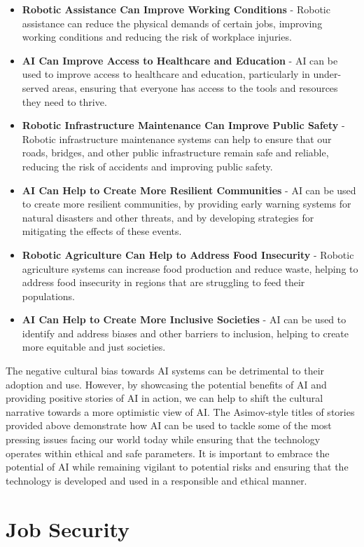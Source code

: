 \documentclass{article}
\begin{document}
\begin{itemize}
\item \textbf{Robotic Assistance Can Improve Working Conditions} - Robotic assistance can reduce the physical demands of certain jobs, improving working conditions and reducing the risk of workplace injuries.
\item \textbf{AI Can Improve Access to Healthcare and Education} - AI can be used to improve access to healthcare and education, particularly in under-served areas, ensuring that everyone has access to the tools and resources they need to thrive.
\item \textbf{Robotic Infrastructure Maintenance Can Improve Public Safety} - Robotic infrastructure maintenance systems can help to ensure that our roads, bridges, and other public infrastructure remain safe and reliable, reducing the risk of accidents and improving public safety.
\item \textbf{AI Can Help to Create More Resilient Communities} - AI can be used to create more resilient communities, by providing early warning systems for natural disasters and other threats, and by developing strategies for mitigating the effects of these events.
\item \textbf{Robotic Agriculture Can Help to Address Food Insecurity} - Robotic agriculture systems can increase food production and reduce waste, helping to address food insecurity in regions that are struggling to feed their populations.
\item \textbf{AI Can Help to Create More Inclusive Societies} - AI can be used to identify and address biases and other barriers to inclusion, helping to create more equitable and just societies.
\end{itemize}

The negative cultural bias towards AI systems can be detrimental to their adoption and use. However, by showcasing the potential benefits of AI and providing positive stories of AI in action, we can help to shift the cultural narrative towards a more optimistic view of AI. The Asimov-style titles of stories provided above demonstrate how AI can be used to tackle some of the most pressing issues facing our world today while ensuring that the technology operates within ethical and safe parameters. It is important to embrace the potential of AI while remaining vigilant to potential risks and ensuring that the technology is developed and used in a responsible and ethical manner.

\section{Job Security}
\end{document}
